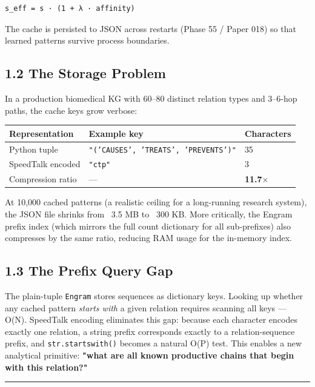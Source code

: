\begin{lstlisting}
s_eff = s · (1 + λ · affinity)
\end{lstlisting}

The cache is persisted to JSON across restarts (Phase 55 / Paper 018) so that
learned patterns survive process boundaries.

\subsection*{1.2 The Storage Problem}

In a production biomedical KG with 60--80 distinct relation types and 3--6-hop paths,
the cache keys grow verbose:

\begin{table}[h]
\small\centering
\begin{tabular}{lll}
\toprule
Representation & Example key & Characters \\
\midrule
Python tuple & \texttt{"('CAUSES', 'TREATS', 'PREVENTS')"} & 35 \\
SpeedTalk encoded & \texttt{"ctp"} & 3 \\
Compression ratio & --- & \textbf{11.7$\times$} \\
\bottomrule
\end{tabular}
\end{table}


At 10,000 cached patterns (a realistic ceiling for a long-running research system),
the JSON file shrinks from ~3.5 MB to ~300 KB.  More critically, the Engram prefix
index (which mirrors the full count dictionary for all sub-prefixes) also compresses
by the same ratio, reducing RAM usage for the in-memory index.

\subsection*{1.3 The Prefix Query Gap}

The plain-tuple \texttt{Engram} stores sequences as dictionary keys.  Looking up whether
any cached pattern \textit{starts with} a given relation requires scanning all keys --- O(N).
SpeedTalk encoding eliminates this gap: because each character encodes exactly one
relation, a string prefix corresponds exactly to a relation-sequence prefix, and
\texttt{str.startswith()} becomes a natural O(P) test.  This enables a new analytical
primitive: \textbf{"what are all known productive chains that begin with this relation?"}

\medskip\noindent\rule{\linewidth}{0.4pt}\medskip

